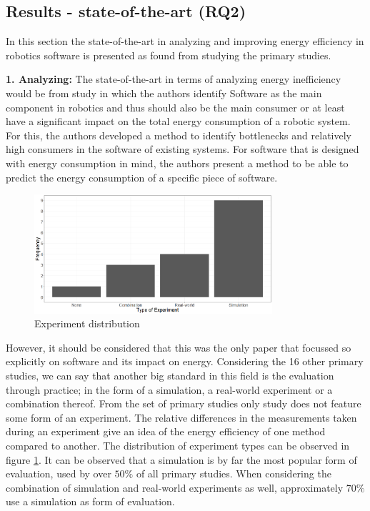 \subsection{Results - state-of-the-art (RQ2)}
\label{sec:results:rq2_state_of_the_art}
In this section the state-of-the-art in analyzing and improving energy efficiency in robotics software is presented as found from studying the primary studies.

\noindent\textbf{1. Analyzing:}
The state-of-the-art in terms of analyzing energy inefficiency would be from study \cite{hou2017novel_cloud_evaluation_model} in which the authors
identify Software as the main component in robotics and thus should also be the main consumer or at least have a significant impact on the
total energy consumption of a robotic system.
For this, the authors developed a method to identify bottlenecks and relatively high consumers in the software of existing systems.
For software that is designed with energy consumption in mind, the authors present a method to be able to predict the energy consumption
of a specific piece of software.

\begin{figure}
    \includegraphics[width=250pt]{figures/experiment_distr.png}
    \caption{Experiment distribution}
    \label{fig:experiment_distr}
\end{figure}

However, it should be considered that this was the only paper that focussed so explicitly on software and its impact on energy.
Considering the 16 other primary studies, we can say that another big standard in this field is the evaluation through practice; 
in the form of a simulation, a real-world experiment or a combination thereof.
From the set of primary studies only study \cite{barili1995efficient_motion} does not feature some form of an experiment.
The relative differences in the measurements taken during an experiment give an idea of the energy efficiency of one method compared to another.
The distribution of experiment types can be observed in figure \ref{fig:experiment_distr}.
It can be observed that a simulation is by far the most popular form of evaluation, used by over $50\%$ of all primary studies.
When considering the combination of simulation and real-world experiments as well, approximately $70\%$ use a simulation as form of evaluation.


